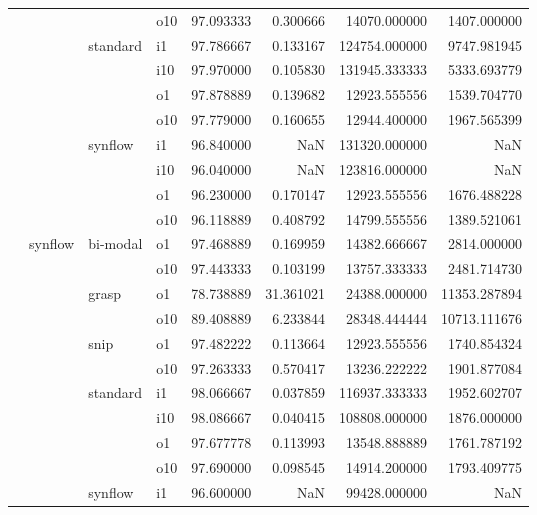 \begin{longtable}{llllrrrr}
      &     &         & o10 &  97.093333 &   0.300666 &     14070.000000 &   1407.000000 \\
      &     & standard & i1 &  97.786667 &   0.133167 &    124754.000000 &   9747.981945 \\
      &     &         & i10 &  97.970000 &   0.105830 &    131945.333333 &   5333.693779 \\
      &     &         & o1 &  97.878889 &   0.139682 &     12923.555556 &   1539.704770 \\
      &     &         & o10 &  97.779000 &   0.160655 &     12944.400000 &   1967.565399 \\
      &     & synflow & i1 &  96.840000 &        NaN &    131320.000000 &           NaN \\
      &     &         & i10 &  96.040000 &        NaN &    123816.000000 &           NaN \\
      &     &         & o1 &  96.230000 &   0.170147 &     12923.555556 &   1676.488228 \\
      &     &         & o10 &  96.118889 &   0.408792 &     14799.555556 &   1389.521061 \\
      & synflow & bi-modal & o1 &  97.468889 &   0.169959 &     14382.666667 &   2814.000000 \\
      &     &         & o10 &  97.443333 &   0.103199 &     13757.333333 &   2481.714730 \\
      &     & grasp & o1 &  78.738889 &  31.361021 &     24388.000000 &  11353.287894 \\
      &     &         & o10 &  89.408889 &   6.233844 &     28348.444444 &  10713.111676 \\
      &     & snip & o1 &  97.482222 &   0.113664 &     12923.555556 &   1740.854324 \\
      &     &         & o10 &  97.263333 &   0.570417 &     13236.222222 &   1901.877084 \\
      &     & standard & i1 &  98.066667 &   0.037859 &    116937.333333 &   1952.602707 \\
      &     &         & i10 &  98.086667 &   0.040415 &    108808.000000 &   1876.000000 \\
      &     &         & o1 &  97.677778 &   0.113993 &     13548.888889 &   1761.787192 \\
      &     &         & o10 &  97.690000 &   0.098545 &     14914.200000 &   1793.409775 \\
      &     & synflow & i1 &  96.600000 &        NaN &     99428.000000 &           NaN \\

\end{longtable}
